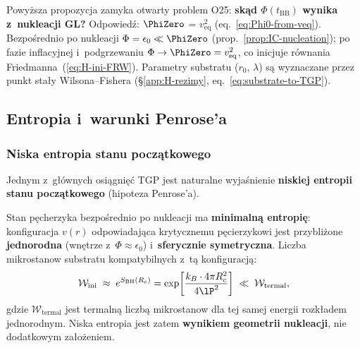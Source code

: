 \begin{remark}
\label{rem:O25-bridge}
Powy\.zsza propozycja zamyka otwarty problem O25:
\textbf{sk\k{a}d $\Phi(t_{\mathrm{BB}})$ wynika z~nukleacji GL?}
Odpowied\'z: $\PhiZero$ = $v_{\mathrm{eq}}^2$ (eq.~\ref{eq:Phi0-from-veq}).
Bezpo\'srednio po nukleacji $\Phi = \epsilon_0 \ll \PhiZero$
(prop.~\ref{prop:IC-nucleation}); po fazie inflacyjnej
i~podgrzewaniu $\Phi \to \PhiZero = v_{\mathrm{eq}}^2$,
co inicjuje r\'ownania Friedmanna~(\ref{eq:H-ini-FRW}).
Parametry substratu ($r_0$, $\lambda$) s\k{a} wyznaczane
przez punkt sta\l{}y Wilsona--Fishera
(\S\ref{app:H-rezimy}, eq.~\ref{eq:substrate-to-TGP}).
\end{remark}

\subsection{Entropia i~warunki Penrose'a}%
\label{app:G-entropia}

\subsubsection{Niska entropia stanu pocz\k{a}tkowego}

Jednym z~g\l{}\'ownych osi\k{a}gni\k{e}\'c TGP jest naturalne
wyja\'snienie \textbf{niskiej entropii stanu pocz\k{a}tkowego}
(hipoteza Penrose'a).

\begin{proposition}\label{prop:low-entropy}
Stan p\k{e}cherzyka bezpo\'srednio po nukleacji ma
\textbf{minimaln\k{a} entropi\k{e}}: konfiguracja $v(r)$
odpowiadaj\k{a}ca krytycznemu p\k{e}cierzykowi jest
przybli\.zone \textbf{jednorodna} (wn\k{e}trze z~$\Phi \approx \epsilon_0$)
i~\textbf{sferycznie symetryczna}. Liczba mikrostanow
substratu kompatybilnych z~t\k{a} konfiguracj\k{a}:
\begin{equation}\label{eq:low-entropy-count}
    \mathcal{W}_\mathrm{ini} \;\approx\; e^{S_\mathrm{BH}(R_c)}
    = \exp\!\left[\frac{k_B\cdot 4\pi R_c^2}{4\lP^2}\right]
    \;\ll\; \mathcal{W}_\mathrm{termal},
\end{equation}
gdzie $\mathcal{W}_\mathrm{termal}$ jest termaln\k{a}
liczb\k{a} mikrostanow dla tej samej energii rozk\l{}adem
jednorodnym. Niska entropia jest zatem \textbf{wynikiem
geometrii nukleacji}, nie dodatkowym za\l{}o\.zeniem.
\end{proposition}

